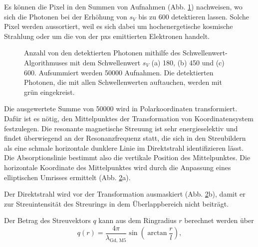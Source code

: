 \noindent
Es können die Pixel in den Summen von Aufnahmen (Abb. \ref{fig:th_180_450_600}) nachweisen, wo sich die Photonen bei der Erhöhung von $s_V$ bis zu \SI{600}{\adu} detektieren lassen. Solche Pixel werden aussortiert, weil es sich dabei um hochenergetische kosmische Strahlung oder um die von der \gls{pxs} emittierten Elektronen handelt.
\begin{figure}[H]
    \centering
    
    \caption{Anzahl von den detektierten Photonen mithilfe des Schwellenwert-Algorithmuses mit dem Schwellenwert $s_V$ (a) \SI{180}{\adu}, (b) \SI{450}{\adu} und (c) \SI{600}{\adu}. Aufsummiert werden \num{50000} Aufnahmen. Die detektierten Photonen, die mit allen Schwellenwerten auftauchen, werden mit grün eingekreist.}
    \label{fig:th_180_450_600}
\end{figure}
\noindent
Die ausgewertete Summe von \SI{50000}{\captures} wird in Polarkoordinaten transformiert. Dafür ist es nötig, den Mittelpunktes der Transformation von Koordinatensystem festzulegen. Die resonante magnetische Streuung ist sehr energieselektiv und findet überwiegend an der Resonanzfrequenz statt, die sich in den Streubildern als eine schmale horizontale dunklere Linie im Direktstrahl identifizieren lässt. Die Absorptionslinie bestimmt also die vertikale Position des Mittelpunktes. Die horizontale Koordinate des Mittelpunktes wird durch die Anpassung eines elliptischen Umrisses ermittelt (Abb. \ref{fig:th-100-200-maske-radial-transform}a).
\begin{figure}[H]
    \centering
    
    \caption{}
    \label{fig:th-100-200-maske-radial-transform}
\end{figure}
\noindent
Der Direktstrahl wird vor der Transformation ausmaskiert (Abb. \ref{fig:th-100-200-maske-radial-transform}b), damit er zur Streuintensität des Streurings in dem Überlappbereich nicht beiträgt.

\noindent
Der Betrag des Streuvektors $q$ kann aus dem Ringradius $r$ berechnet werden über
\begin{equation}
    q(r) = \frac{4\pi}{\lambda_\text{Gd, M5}}\sin\left(\arctan\frac{r}{l}\right),
    \label{eq:streuvektor_von_radius}
\end{equation}

